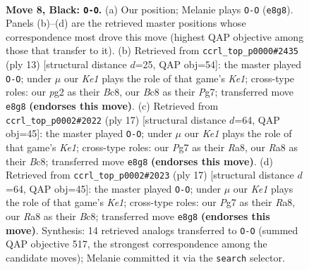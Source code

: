 \documentclass[11pt]{article}
\begin{document}
\begin{figure}[p]\centering
\begin{subfigure}{0.46\textwidth}\centering
\resizebox{\linewidth}{!}{%
\newchessgame
\chessboard[
  setfen={rnb1k2r/1ppnqppp/p3p3/3pP3/3P1P2/2N4N/PPP3PP/R2QKB1R b KQkq - 1 8},
  showmover=false,
  pgfstyle=straightmove, color=movearrow, markmove={e8-g8}
]}
\caption{}
\end{subfigure}\hfill
\begin{subfigure}{0.46\textwidth}\centering
\resizebox{\linewidth}{!}{%
\newchessgame
\chessboard[
  setfen={rnb1k2r/pppnqppp/4p3/3pP3/3P1P2/2N5/PPP3PP/R2QKBNR b KQkq - 0 7},
  showmover=false,
  pgfstyle=straightmove, color=movearrow, markmove={e8-g8}
]}
\caption{}
\end{subfigure}
\\[4pt]
\begin{subfigure}{0.46\textwidth}\centering
\resizebox{\linewidth}{!}{%
\newchessgame
\chessboard[
  setfen={rnb1k2r/p4ppp/1ppq1n2/3p4/3P4/P1N1PN2/1P3PPP/R2QKB1R b KQkq - 1 9},
  showmover=false,
  pgfstyle=straightmove, color=movearrow, markmove={e8-g8}
]}
\caption{}
\end{subfigure}\hfill
\begin{subfigure}{0.46\textwidth}\centering
\resizebox{\linewidth}{!}{%
\newchessgame
\chessboard[
  setfen={rnb1k2r/p4ppp/1ppq1n2/3p4/3P4/P1N1PN2/1P3PPP/R2QKB1R b KQkq - 1 9},
  showmover=false,
  pgfstyle=straightmove, color=movearrow, markmove={e8-g8}
]}
\caption{}
\end{subfigure}
\caption{\textbf{Move 8, Black: \texttt{O-O}.} (a) Our position; Melanie plays \texttt{O-O} (\texttt{e8g8}). Panels (b)--(d) are the retrieved master positions whose correspondence most drove this move (highest QAP objective among those that transfer to it). (b) Retrieved from \texttt{ccrl\_top\_p0000\#2435} (ply 13) [structural distance $d$=25, QAP obj=54]: the master played \texttt{O-O}; under $\mu$ our \emph{Ke1} plays the role of that game's \emph{Ke1}; cross-type roles: our \emph{p}g2 as their \emph{B}c8, our \emph{B}c8 as their \emph{P}g7; transferred move \texttt{e8g8} \textbf{(endorses this move)}. (c) Retrieved from \texttt{ccrl\_top\_p0002\#2022} (ply 17) [structural distance $d$=64, QAP obj=45]: the master played \texttt{O-O}; under $\mu$ our \emph{Ke1} plays the role of that game's \emph{Ke1}; cross-type roles: our \emph{P}g7 as their \emph{R}a8, our \emph{R}a8 as their \emph{B}c8; transferred move \texttt{e8g8} \textbf{(endorses this move)}. (d) Retrieved from \texttt{ccrl\_top\_p0002\#2023} (ply 17) [structural distance $d$=64, QAP obj=45]: the master played \texttt{O-O}; under $\mu$ our \emph{Ke1} plays the role of that game's \emph{Ke1}; cross-type roles: our \emph{P}g7 as their \emph{R}a8, our \emph{R}a8 as their \emph{B}c8; transferred move \texttt{e8g8} \textbf{(endorses this move)}. Synthesis: 14 retrieved analogs transferred to \texttt{O-O} (summed QAP objective 517, the strongest correspondence among the candidate moves); Melanie committed it via the \texttt{search} selector.}
\label{fig:thought-m15}
\end{figure}
\end{document}
